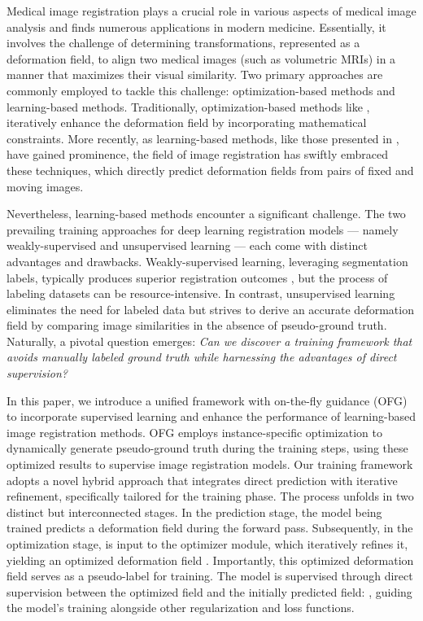 \documentclass[10pt,twocolumn,letterpaper]{article}
\begin{document}
Medical image registration plays a crucial role in various aspects of medical image analysis and finds numerous applications in modern medicine. Essentially, it involves the challenge of determining transformations, represented as a deformation field, to align two medical images (such as volumetric MRIs) in a manner that maximizes their visual similarity. Two primary approaches are commonly employed to tackle this challenge: optimization-based methods and learning-based methods. Traditionally, optimization-based methods like \cite{AVANTS200826, BAJCSY19891, 1175091}, iteratively enhance the deformation field by incorporating mathematical constraints. More recently, as learning-based methods, like those presented in \cite{Chen_2022, chen2021vitvnet}, have gained prominence, the field of image registration has swiftly embraced these techniques, which directly predict deformation fields from pairs of fixed and moving images.



Nevertheless, learning-based methods encounter a significant challenge. The two prevailing training approaches for deep learning registration models — namely weakly-supervised and unsupervised learning — each come with distinct advantages and drawbacks. Weakly-supervised learning, leveraging segmentation labels, typically produces superior registration outcomes \cite{Balakrishnan_2019}, but the process of labeling datasets can be resource-intensive. In contrast, unsupervised learning eliminates the need for labeled data but strives to derive an accurate deformation field by comparing image similarities in the absence of pseudo-ground truth. Naturally, a pivotal question emerges: \textit{Can we discover a training framework that avoids manually labeled ground truth while harnessing the advantages of direct supervision?}

In this paper, we introduce a unified framework with on-the-fly guidance (OFG) to incorporate supervised learning and enhance the performance of learning-based image registration methods. OFG employs instance-specific optimization to dynamically generate pseudo-ground truth during the training steps, using these optimized results to supervise image registration models. Our training framework adopts a novel hybrid approach that integrates direct prediction with iterative refinement, specifically tailored for the training phase. The process unfolds in two distinct but interconnected stages. In the prediction stage, the model being trained predicts a deformation field  during the forward pass. Subsequently, in the optimization stage,  is input to the optimizer module, which iteratively refines it, yielding an optimized deformation field . Importantly, this optimized deformation field serves as a pseudo-label for training. The model is supervised through direct supervision between the optimized field and the initially predicted field: , guiding the model's training alongside other regularization and loss functions.
\end{document}
